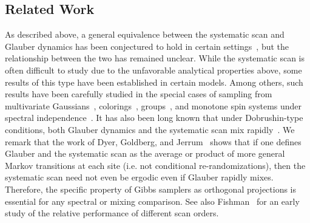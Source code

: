 \documentclass[11pt]{article}
\begin{document}
\subsection{Related Work}
\label{sec:related}
As described above, a general equivalence between the systematic scan and Glauber dynamics has been conjectured to hold in certain settings~\cite{diaconis,levin2017markov}, but the relationship between the two has remained unclear. While the systematic scan is often difficult to study due to the unfavorable analytical properties above, some results of this type have been established in certain models. Among others, such results have been carefully studied in the special cases of sampling from multivariate Gaussians~\cite{amit}, colorings~\cite{dyer_colors}, groups~\cite{diaconis_ram}, and monotone spin systems under spectral independence~\cite{DBLP:conf/approx/BlancaZ23}. It has also been long known that under Dobrushin-type conditions, both Glauber dynamics and the systematic scan mix rapidly~\cite{simon,DBLP:conf/approx/DyerGJ06}. We remark that the work of Dyer, Goldberg, and Jerrum~\cite{DBLP:conf/approx/DyerGJ06} shows that if one defines Glauber and the systematic scan as the average or product of more general Markov transitions at each site (i.e. not conditional re-randomizations), then the systematic scan need not even be ergodic even if Glauber rapidly mixes. Therefore, the specific property of Gibbs samplers as orthogonal projections is essential for any spectral or mixing comparison. See also Fishman~\cite{fishman} for an early study of the relative performance of different scan orders.
\end{document}
